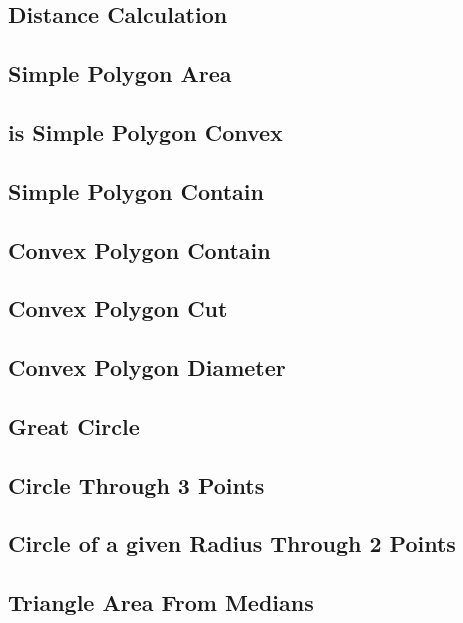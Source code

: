 \documentclass{article}
\begin{document}
    \subsection{Distance Calculation}
        
    \subsection{Simple Polygon Area}
        
    \subsection{is Simple Polygon Convex}
        
    \subsection{Simple Polygon Contain}
        
    \subsection{Convex Polygon Contain}
        
    \subsection{Convex Polygon Cut}
        
    \subsection{Convex Polygon Diameter}
        
    \subsection{Great Circle}
    \subsection{Circle Through 3 Points}
    \subsection{Circle of a given Radius Through 2 Points}
    \subsection{Triangle Area From Medians}
        
\end{document}
